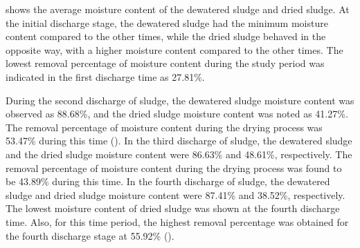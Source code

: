 

 shows the average moisture content of the dewatered sludge and dried sludge. At the initial discharge stage, the dewatered sludge had the minimum moisture content compared to the other times, while the dried sludge behaved in the opposite way, with a higher moisture content compared to the other times. The lowest removal percentage of moisture content during the study period was indicated in the first discharge time as 27.81\%.

During the second discharge of sludge, the dewatered sludge moisture content was observed as 88.68\%, and the dried sludge moisture content was noted as 41.27\%. The removal percentage of moisture content during the drying process was 53.47\% during this time (). In the third discharge of sludge, the dewatered sludge and the dried sludge moisture content were 86.63\% and 48.61\%, respectively. The removal percentage of moisture content during the drying process was found to be 43.89\% during this time. In the fourth discharge of sludge, the dewatered sludge and dried sludge moisture content were 87.41\% and 38.52\%, respectively. The lowest moisture content of dried sludge was shown at the fourth discharge time. Also, for this time period, the highest removal percentage was obtained for the fourth discharge stage at 55.92\% ().



